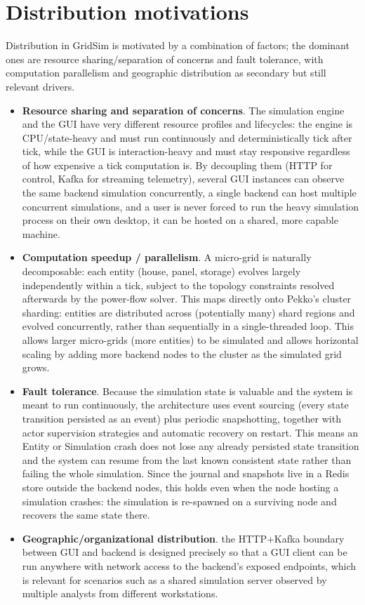 \documentclass{scrreprt}
\begin{document}
\section{Distribution motivations}

Distribution in GridSim is motivated by a combination of factors; the dominant ones are
resource sharing/separation of concerns and fault tolerance, with computation parallelism
and geographic distribution as secondary but still relevant drivers.

\begin{itemize}
    \item \textbf{Resource sharing and separation of concerns}. The simulation engine and the GUI have very
    different resource profiles and lifecycles: the engine is CPU/state-heavy and must run
    continuously and deterministically tick after tick, while the GUI is interaction-heavy and
    must stay responsive regardless of how expensive a tick computation is. By decoupling them
    (HTTP for control, Kafka for streaming telemetry), several GUI instances can observe the
    same backend simulation concurrently, a single backend can host multiple concurrent
    simulations, and a user is never forced to run the heavy simulation process on their own desktop, it can be hosted on a shared, more capable machine.
    \item \textbf{Computation speedup / parallelism}. A micro-grid is naturally decomposable: each entity
    (house, panel, storage) evolves largely independently within a tick, subject to the
    topology constraints resolved afterwards by the power-flow solver. This maps directly onto
    Pekko's cluster sharding: entities are distributed across (potentially many) shard regions
    and evolved concurrently, rather than sequentially in a single-threaded loop. This allows
    larger micro-grids (more entities) to be simulated and allows horizontal scaling by adding more
    backend nodes to the cluster as the simulated grid grows.
    \item \textbf{Fault tolerance}. Because the simulation state is valuable and the system is meant to run continuously, the architecture uses event sourcing (every state transition persisted as an event) plus periodic snapshotting, together with actor supervision strategies and automatic recovery on restart. This means an Entity or Simulation crash does not lose any already persisted state transition and the system can resume from the
    last known consistent state rather than failing the whole simulation. Since the journal and snapshots live in a Redis store outside the backend nodes, this holds even when the node hosting a simulation crashes: the simulation is re-spawned on a surviving node and recovers the same state there.
    \item  \textbf{Geographic/organizational distribution}. the HTTP+Kafka boundary between GUI and backend is designed precisely so that a GUI client can be run anywhere with network access to the backend's exposed endpoints, which is relevant for scenarios such as a shared simulation server observed by multiple
    analysts from different workstations.
\end{itemize}
\end{document}
